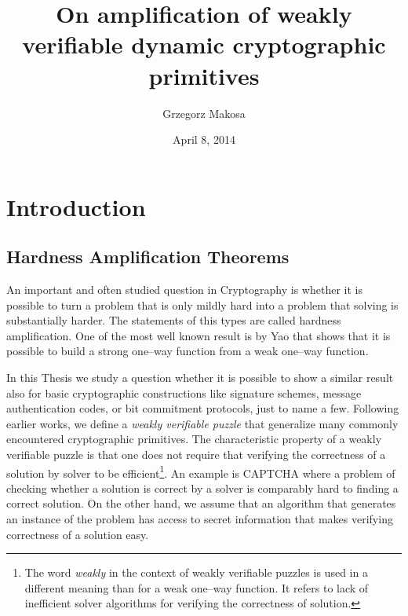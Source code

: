 \documentclass[11pt,a4paper,titlepage]{memoir}
\title{On amplification of weakly verifiable dynamic cryptographic primitives}
\author{Grzegorz Makosa}
\date{April 8, 2014}
\begin{document}
\frontmatter

%

\cleartorecto
\tableofcontents
\mainmatter

\chapter{Introduction}
\section{Hardness Amplification Theorems}
An important and often studied question in Cryptography is whether it is possible to turn a problem
that is only mildly hard into a problem that solving is substantially harder. The statements of this
types are called hardness amplification. One of the most well known result is by Yao \cite{Goldreich:2000:FCB:519078}
that shows that it is possible to build a strong one--way function from a weak one--way function.

In this Thesis we study a question whether it is possible to show a similar result also for basic cryptographic constructions
like signature schemes, message authentication codes, or bit commitment protocols, just to name a few.
Following earlier works, we define a \textit{weakly verifiable puzzle} that generalize many commonly encountered cryptographic primitives.
The characteristic property of a weakly verifiable puzzle is that one does not require that verifying the correctness of a solution by solver to be efficient\footnote{
The word \textit{weakly} in the context of weakly verifiable puzzles is used in a different meaning than for a weak one--way function.
It refers to lack of inefficient solver algorithms for verifying the correctness of solution.}.
An example is CAPTCHA where a problem of checking whether a solution is correct by a solver is comparably hard to finding a correct solution.
On the other hand, we assume that an algorithm that generates an instance of the problem has access to secret information
that makes verifying correctness of a solution easy.
\end{document}
